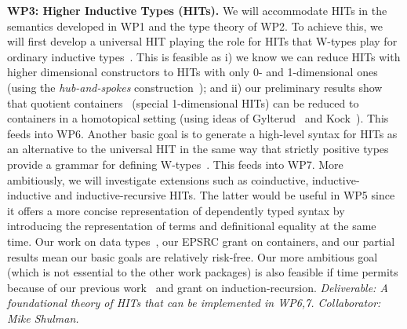 \documentclass[a4paper,11pt]{article}
\begin{document}
{\bf WP3: Higher Inductive Types (HITs).}  We will accommodate HITs in
the semantics developed in WP1 and the type theory of WP2. To achieve
this, we will first develop a universal HIT playing the role for HITs
that W-types play for ordinary inductive
types~\cite{alti:cont-tcs}. This is feasible as i) we know we can
reduce HITs with higher dimensional constructors to HITs with only 0-
and 1-dimensional ones (using the \emph{hub-and-spokes}
construction~\cite{hott-book}); and ii) our preliminary results show
that quotient containers~\cite{alti:mpc04} (special 1-dimensional
HITs) can be reduced to containers in a homotopical setting (using
ideas of Gylterud~\cite{gylterud:thesis} and
Kock~\cite{kock:groupoids}). This feeds into WP6.  Another basic goal
is to generate a high-level syntax for HITs as an alternative to the
universal HIT in the same way that strictly positive types provide a
grammar for defining W-types~\cite{alti:cont-tcs}.  This feeds into
WP7.  More ambitiously, we will investigate extensions such as
coinductive, inductive-inductive and inductive-recursive HITs. The
latter would be useful in WP5 since it offers a more concise
representation of dependently typed syntax by introducing the
representation of terms and definitional equality at the same time.
Our work on data types~\cite{alti:cont-tcs, alti:mpc04,
  altenkirchGhaniHancockMcBrideMorris:indexedContainers,
  GambinoN:polfpm,awodeyGamSoja:indTypesInHTT}, our EPSRC grant on
containers, and our partial results mean our basic goals are
relatively risk-free.  Our more ambitious goal (which is not essential
to the other work packages) is also feasible if time permits because
of our previous work~\cite{alti:catind2,ghani:fibredIR} and grant on
induction-recursion. {\em Deliverable: A foundational theory of HITs
  that can be implemented in WP6,7.  Collaborator: Mike Shulman.  }
\end{document}
